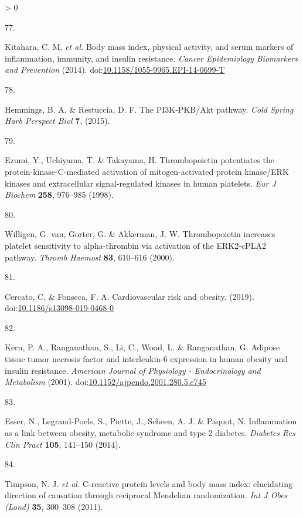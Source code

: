 \documentclass[11pt,twoside]{bristolthesis}
\newlength{\cslhangindent}
\newlength{\csllabelwidth}
\newenvironment{CSLReferences}[2] %
 {%
  \setlength{\parindent}{0pt}
  \ifodd #1 \everypar{\setlength{\hangindent}{\cslhangindent}}\ignorespaces\fi
  \ifnum #2 > 0
  \setlength{\parskip}{#2\baselineskip}
  \fi
 }%
 {}
\newcommand{\CSLLeftMargin}[1]{\parbox[t]{\csllabelwidth}{#1}}
\newcommand{\CSLRightInline}[1]{\parbox[t]{\linewidth - \csllabelwidth}{#1}\break}
\begin{document}
\begin{CSLReferences}{0}{0}
\leavevmode\hypertarget{ref-Kitahara2014}{}%
\CSLLeftMargin{77. }
\CSLRightInline{Kitahara, C. M. \emph{et al.} {Body mass index, physical activity, and serum markers of inflammation, immunity, and insulin resistance}. \emph{Cancer Epidemiology Biomarkers and Prevention} (2014). doi:\href{https://doi.org/10.1158/1055-9965.EPI-14-0699-T}{10.1158/1055-9965.EPI-14-0699-T}}

\leavevmode\hypertarget{ref-Hemmings2015}{}%
\CSLLeftMargin{78. }
\CSLRightInline{Hemmings, B. A. \& Restuccia, D. F. {The PI3K-PKB/Akt pathway}. \emph{Cold Spring Harb Perspect Biol} \textbf{7}, (2015).}

\leavevmode\hypertarget{ref-Ezumi1998}{}%
\CSLLeftMargin{79. }
\CSLRightInline{Ezumi, Y., Uchiyama, T. \& Takayama, H. {Thrombopoietin potentiates the protein-kinase-C-mediated activation of mitogen-activated protein kinase/ERK kinases and extracellular signal-regulated kinases in human platelets}. \emph{Eur J Biochem} \textbf{258}, 976--985 (1998).}

\leavevmode\hypertarget{ref-VanWilligen2000}{}%
\CSLLeftMargin{80. }
\CSLRightInline{Willigen, G. van, Gorter, G. \& Akkerman, J. W. {Thrombopoietin increases platelet sensitivity to alpha-thrombin via activation of the ERK2-cPLA2 pathway}. \emph{Thromb Haemost} \textbf{83}, 610--616 (2000).}

\leavevmode\hypertarget{ref-Cercato2019}{}%
\CSLLeftMargin{81. }
\CSLRightInline{Cercato, C. \& Fonseca, F. A. {Cardiovascular risk and obesity}. (2019). doi:\href{https://doi.org/10.1186/s13098-019-0468-0}{10.1186/s13098-019-0468-0}}

\leavevmode\hypertarget{ref-Kern2001}{}%
\CSLLeftMargin{82. }
\CSLRightInline{Kern, P. A., Ranganathan, S., Li, C., Wood, L. \& Ranganathan, G. {Adipose tissue tumor necrosis factor and interleukin-6 expression in human obesity and insulin resistance}. \emph{American Journal of Physiology - Endocrinology and Metabolism} (2001). doi:\href{https://doi.org/10.1152/ajpendo.2001.280.5.e745}{10.1152/ajpendo.2001.280.5.e745}}

\leavevmode\hypertarget{ref-Esser2014}{}%
\CSLLeftMargin{83. }
\CSLRightInline{Esser, N., Legrand-Poels, S., Piette, J., Scheen, A. J. \& Paquot, N. {Inflammation as a link between obesity, metabolic syndrome and type 2 diabetes}. \emph{Diabetes Res Clin Pract} \textbf{105}, 141--150 (2014).}

\leavevmode\hypertarget{ref-Timpson2011}{}%
\CSLLeftMargin{84. }
\CSLRightInline{Timpson, N. J. \emph{et al.} {C-reactive protein levels and body mass index: elucidating direction of causation through reciprocal Mendelian randomization}. \emph{Int J Obes (Lond)} \textbf{35}, 300--308 (2011).}


\end{CSLReferences}
\end{document}
